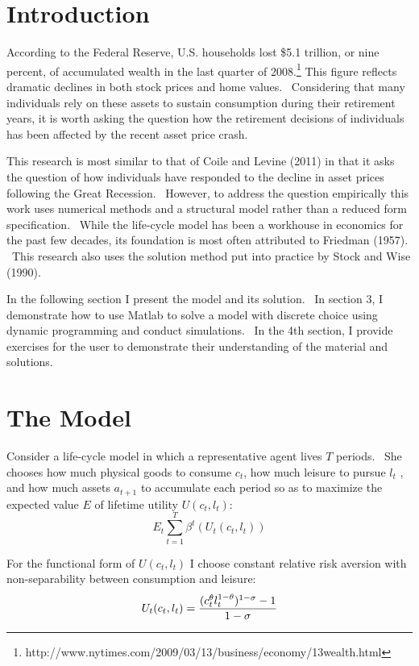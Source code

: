 \documentclass[12pt]{article}
\begin{document}
\section{Introduction}

According to the Federal Reserve, U.S. households lost \$5.1 trillion, or
nine percent, of accumulated wealth in the last quarter of 2008.\footnote{%
http://www.nytimes.com/2009/03/13/business/economy/13wealth.html} This
figure reflects dramatic declines in both stock prices and home values. \
Considering that many individuals rely on these assets to sustain
consumption during their retirement years, it is worth asking the question
how the retirement decisions of individuals has been affected by the recent
asset price crash. \ 

This research is most similar to that of Coile and Levine (2011) in that it
asks the question of how individuals have responded to the decline in asset
prices following the Great Recession. \ However, to address the question
empirically this work uses numerical methods and a structural model rather
than a reduced form specification. \ While the life-cycle model has been a
workhouse in economics for the past few decades, its foundation is most
often attributed to Friedman (1957). \ This research also uses the solution
method put into practice by Stock and Wise (1990). \ 

In the following section I present the model and its solution. \ In section
3, I demonstrate how to use Matlab to solve a model with discrete choice
using dynamic programming and conduct simulations. \ In the 4th section, I
provide exercises for the user to demonstrate their understanding of the
material and solutions.

\section{The Model}

Consider a life-cycle model in which a representative agent lives $T$
periods. \ She chooses how much physical goods to consume $c_{t}$, how much
leisure to pursue $l_{t}$ , and how much assets $a_{t+1}$ to accumulate each
period so as to maximize the expected value $E$ of lifetime utility $%
U(c_{t},l_{t})$:%
\begin{equation}
E_{t}\sum_{t=1}^{T}\beta ^{t}(U_{t}(c_{t},l_{t}))
\end{equation}

\noindent%
For the functional form of $U(c_{t},l_{t})$ I choose constant relative risk
aversion with non-separability between consumption and leisure:  
\begin{equation}
U_{t}(c_{t},l_{t})=\frac{(c_{t}^{\theta }l_{t}^{1-\theta })^{1-\sigma }-1}{%
1-\sigma }
\end{equation}
\end{document}
